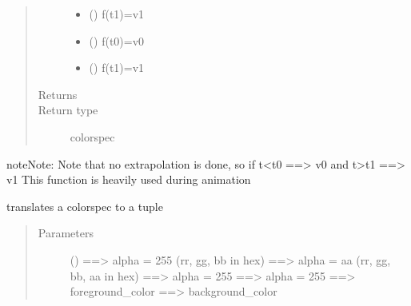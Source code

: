 \documentclass[letterpaper,10pt,english]{sphinxmanual}
\begin{document}
\begin{fulllineitems}
\begin{fulllineitems}
\begin{quote}
\begin{description}
\begin{itemize}
\item {} 
 () \textendash{} f(t1)=v1

\item {} 
 () \textendash{} f(t0)=v0

\item {} 
 () \textendash{} f(t1)=v1

\end{itemize}

\item[{Returns}] \leavevmode
{}

\item[{Return type}] \leavevmode
colorspec

\end{description}\end{quote}

\begin{sphinxadmonition}{note}{Note:}
Note that no extrapolation is done, so if t\textless{}t0 ==\textgreater{} v0  and t\textgreater{}t1 ==\textgreater{} v1 
This function is heavily used during animation
\end{sphinxadmonition}

\end{fulllineitems}


\begin{fulllineitems}
\label{\detokenize{Reference:salabim.Environment.colorspec_to_tuple}}
translates a colorspec to a tuple
\begin{quote}\begin{description}
\item[{Parameters}] \leavevmode
{} (\sphinxstyleliteralemphasis{\sphinxupquote{, }}) \textendash{}  ==\textgreater{} alpha = 255 (rr, gg, bb in hex) 
 ==\textgreater{} alpha = aa (rr, gg, bb, aa in hex) 
 ==\textgreater{} alpha = 255 
 ==\textgreater{} alpha = 255 
 ==\textgreater{} foreground\_color 
 ==\textgreater{} background\_color


\end{description}
\end{quote}
\end{fulllineitems}
\end{fulllineitems}
\end{document}
